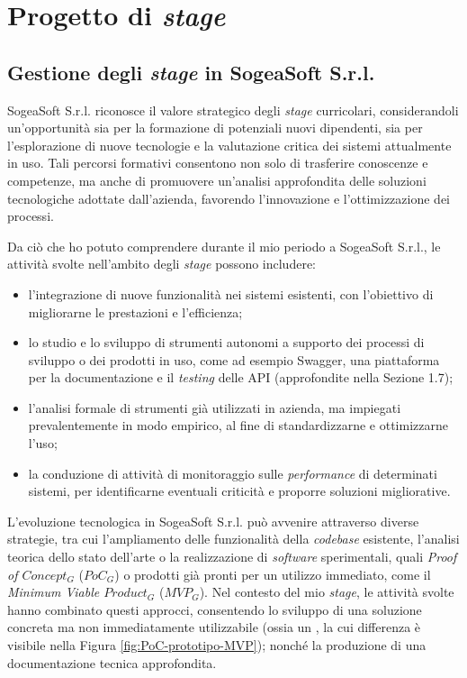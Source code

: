 \chapter{Progetto di \textit{stage}}
    \section{Gestione degli \textit{stage} in SogeaSoft S.r.l.}
    SogeaSoft S.r.l. riconosce il valore strategico degli \textit{stage} curricolari, considerandoli un'opportunità sia per la formazione di potenziali nuovi dipendenti, sia per l'esplorazione di nuove tecnologie e la valutazione critica dei sistemi attualmente in uso. Tali percorsi formativi consentono non solo di trasferire conoscenze e competenze, ma anche di promuovere un'analisi approfondita delle soluzioni tecnologiche adottate dall'azienda, favorendo l'innovazione e l'ottimizzazione dei processi.  

    \vspace{0.2 em}
    \noindent Da ciò che ho potuto comprendere durante il mio periodo a SogeaSoft S.r.l., le attività svolte nell'ambito degli \textit{stage} possono includere: 
    \begin{itemize}
        \item l'integrazione di nuove funzionalità nei sistemi esistenti, con l'obiettivo di migliorarne le prestazioni e l'efficienza;
        \item lo studio e lo sviluppo di strumenti autonomi a supporto dei processi di sviluppo o dei prodotti in uso, come ad esempio Swagger, una piattaforma per la documentazione e il \textit{testing} delle API (approfondite nella Sezione 1.7);  
        \item l'analisi formale di strumenti già utilizzati in azienda, ma impiegati prevalentemente in modo empirico, al fine di standardizzarne e ottimizzarne l'uso;  
        \item la conduzione di attività di monitoraggio sulle \textit{performance} di determinati sistemi, per identificarne eventuali criticità e proporre soluzioni migliorative.  
    \end{itemize}

    \vspace{0.2 em}
    \noindent L'evoluzione tecnologica in SogeaSoft S.r.l. può avvenire attraverso diverse strategie, tra cui l'ampliamento delle funzionalità della \textit{codebase} esistente, l'analisi teorica dello stato dell'arte o la realizzazione di \textit{software} sperimentali, quali \textit{Proof of $Concept_G$} ($PoC_G$) o prodotti già pronti per un utilizzo immediato, come il \textit{Minimum Viable $Product_G$} ($MVP_G$). Nel contesto del mio \textit{stage}, le attività svolte hanno combinato questi approcci, consentendo lo sviluppo di una soluzione concreta ma non immediatamente utilizzabile (ossia un , la cui differenza è visibile nella Figura \ref{fig:PoC-prototipo-MVP}); nonché la produzione di una documentazione tecnica approfondita.  
    
